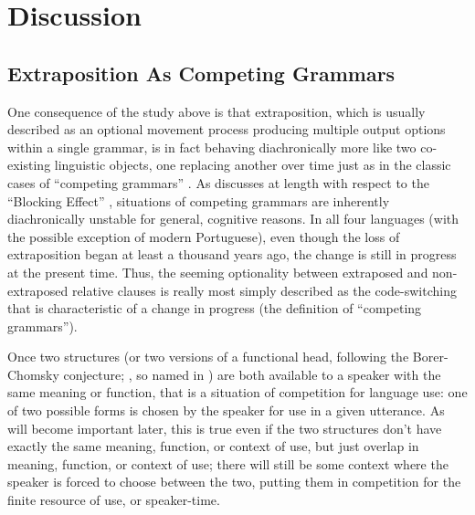 

\section{Discussion}
\subsection{Extraposition As Competing Grammars}
\label{compete}

One consequence of the study above is that extraposition, which is usually described as an optional movement process producing multiple output options within a single grammar, is in fact behaving diachronically more like two co-existing linguistic objects, one replacing another over time just as in the classic cases of ``competing grammars'' \citep[][etc.]{kroch1989, kroch1994, santorini1992}. As \citet{kroch1994} discusses at length with respect to the ``Blocking Effect'' \citep[an expanded understanding of the principle first proposed in ]{aronoff1976}, situations of competing grammars are inherently diachronically unstable for general, cognitive reasons. In all four languages (with the possible exception of modern Portuguese), even though the loss of extraposition began at least a thousand years ago, the change is still in progress at the present time. Thus, the seeming optionality between extraposed and non-extraposed relative clauses is really most simply described as the code-switching that is characteristic of a change in progress (the definition of ``competing grammars'').

Once two structures (or two versions of a functional head, following the Borer-Chomsky conjecture; \citealt{borer1984, kroch1994}, so named in \citealt{baker2008}) are both available to a speaker with the same meaning or function, that is a situation of competition for language use: one of two possible forms is chosen by the speaker for use in a given utterance. As will become important later, this is true even if the two structures don't have exactly the same meaning, function, or context of use, but just overlap in meaning, function, or context of use; there will still be some context where the speaker is forced to choose between the two, putting them in competition for the finite resource of use, or speaker-time.

